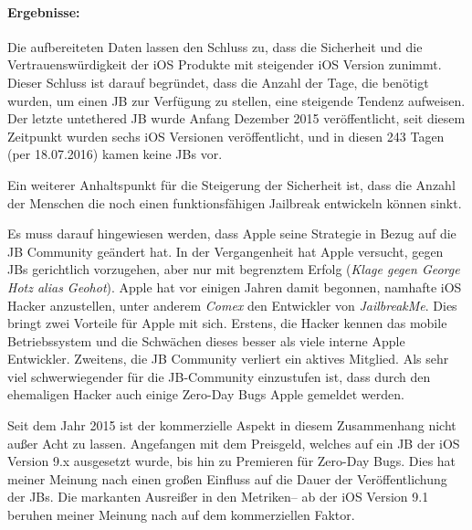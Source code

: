 \paragraph{Ergebnisse:} Die aufbereiteten Daten lassen den Schluss zu, dass die Sicherheit und die Vertrauenswürdigkeit der iOS Produkte mit steigender iOS Version zunimmt. Dieser Schluss ist darauf begründet, dass die Anzahl der Tage, die benötigt wurden, um einen JB zur Verfügung zu stellen, eine steigende Tendenz aufweisen. Der letzte untethered JB wurde Anfang Dezember 2015 veröffentlicht, seit diesem Zeitpunkt wurden sechs iOS Versionen veröffentlicht, und in diesen 243 Tagen (per 18.07.2016) kamen keine JBs vor.\par 
Ein weiterer Anhaltspunkt für die Steigerung der Sicherheit ist, dass die Anzahl der Menschen die noch einen funktionsfähigen Jailbreak entwickeln können sinkt. 
\par 
Es muss darauf hingewiesen werden, dass Apple seine Strategie in Bezug auf die JB Community geändert hat. In der Vergangenheit hat Apple versucht, gegen JBs gerichtlich vorzugehen, aber nur mit begrenztem Erfolg (\textit{\glqq Klage gegen George Hotz alias Geohot\grqq{}}). Apple hat vor einigen Jahren damit begonnen, namhafte iOS Hacker anzustellen, unter anderem \textit{\glqq Comex\grqq{}}  den Entwickler von \textit{\glqq JailbreakMe\grqq}. Dies bringt zwei Vorteile für Apple mit sich. Erstens, die Hacker kennen das mobile Betriebssystem und die Schwächen dieses besser als viele interne Apple Entwickler.  Zweitens, die JB Community verliert ein aktives Mitglied. Als sehr viel schwerwiegender für die JB-Community einzustufen ist, dass durch den ehemaligen Hacker auch einige Zero-Day Bugs Apple gemeldet werden.\par
Seit dem Jahr 2015 ist der kommerzielle Aspekt in diesem Zusammenhang nicht außer Acht zu lassen. Angefangen mit dem Preisgeld, welches auf ein JB der iOS Version 9.x ausgesetzt wurde, bis hin zu Premieren für Zero-Day Bugs. Dies hat meiner Meinung nach einen großen Einfluss auf die Dauer der Veröffentlichung der JBs. Die markanten Ausreißer in den Metriken– ab der iOS Version 9.1 beruhen meiner Meinung nach auf dem kommerziellen Faktor. 

\newpage
